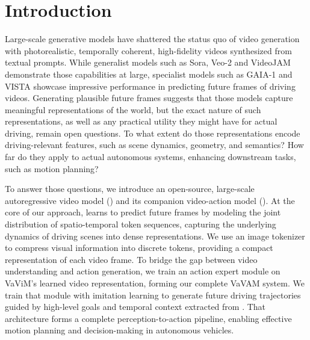 
\section{Introduction}
\label{sec:intro}

Large-scale generative models have shattered the status quo of video generation with photorealistic, temporally coherent, high-fidelity videos synthesized from textual prompts.
While generalist models such as Sora, Veo-2 \citep{veoteam2024veo2} and VideoJAM \citep{chefer2025videojam} demonstrate those capabilities at large, specialist models such as GAIA-1 \citep{hu2023gaia1} and VISTA \citep{gao2024vista} showcase impressive performance in predicting future frames of driving videos.
Generating plausible future frames suggests that those models capture meaningful representations of the world, but the exact nature of such representations, as well as any practical utility they might have for actual driving, remain open questions. To what extent do those representations encode driving-relevant features, such as scene dynamics, geometry, and semantics? How far do they apply to actual autonomous systems, enhancing downstream tasks, such as motion planning?

To answer those questions, we introduce an open-source, large-scale autoregressive video model (\vm) and its companion video-action model (\vam).
At the core of our approach, \vm learns to predict future frames by modeling the joint distribution of spatio-temporal token sequences, capturing the underlying dynamics of driving scenes into dense representations. We use an image tokenizer to compress visual information into discrete tokens, providing a compact representation of each video frame.
To bridge the gap between video understanding and action generation, we train an action expert module on VaViM's learned video representation, forming our complete VaVAM system. We train that module with imitation learning to generate future driving trajectories guided by high-level goals and temporal context extracted from \vm{}. That architecture forms a complete perception-to-action pipeline, enabling effective motion planning and decision-making in autonomous vehicles.

